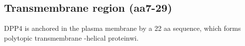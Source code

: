 \subsection{Transmembrane region (aa7-29)}

DPP4 is anchored in the plasma membrane by a 22 aa sequence, which forms polytopic transmembrane \alpha-helical proteinwi. \cite{Hong_1990}